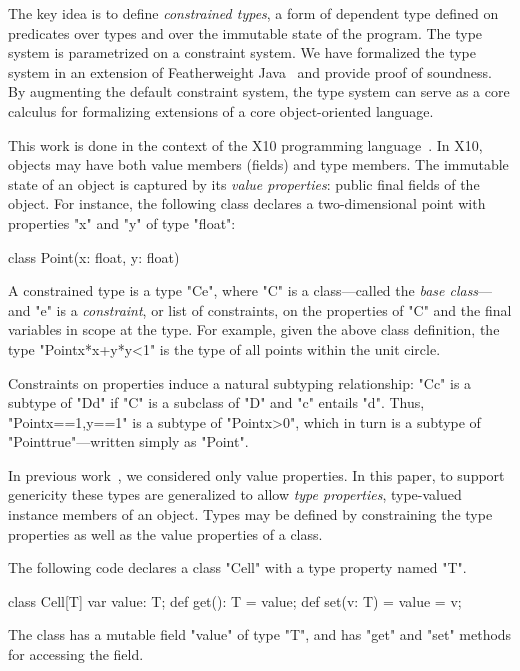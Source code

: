 The key idea is to define \emph{constrained types},
a form of dependent type
defined on predicates over types and over the immutable state of
the program.
The type system is parametrized on a constraint system.
We have formalized the type system in an extension of
Featherweight Java~\cite{FJ}
and provide proof of soundness.
By augmenting the default constraint system,
the type system can serve as a core calculus 
for formalizing extensions of a core object-oriented language. 

This work is done in the context of the X10
programming language~\cite{X10}.
In X10, objects may have both value members (fields)
and type members.
The immutable state of an object is captured by its
\emph{value properties}: public final fields of the object.
For instance, the following class declares a two-dimensional
point with properties \xcd"x" and \xcd"y" of type \xcd"float":
\begin{xten}
class Point(x: float, y: float) { }
\end{xten}

A constrained type is a type \xcd"C{e}", where \xcd"C" is a
class---called the \emph{base class}---and \xcd"e" is a
\emph{constraint}, or list of constraints, on the properties of
\xcd"C" and the final variables in scope at the type.
For example, given the above class definition,
the type \xcd"Point{x*x+y*y<1}" is the type of all
points within the unit circle.


Constraints on properties induce a natural subtyping relationship:
\xcd"C{c}" is a subtype of
\xcd"D{d}" if \xcd"C" is a subclass of \xcd"D" and
\xcd"c" entails \xcd"d".  Thus, \xcd"Point{x==1,y==1}"
is a subtype of \xcd"Point{x>0}", which in turn is a subtype of
\xcd"Point{true}"---written simply as \xcd"Point".

In previous
work~\cite{X10,constrained-types}, we considered
only value properties.
In this paper,
to support genericity these types are generalized
to allow \emph{type properties}, type-valued instance
members of an object.
Types may be defined by constraining the type properties as
well as the value properties of a class.

The following code declares a class \xcd"Cell" with a type
property named \xcd"T".
\begin{xten}
class Cell[T] {
    var value: T;
    def get(): T = value;
    def set(v: T) = { value = v; }
}
\end{xten}
The class has a mutable field \xcd"value" of type \xcd"T",
and has \xcd"get" and \xcd"set" methods for accessing the field.

